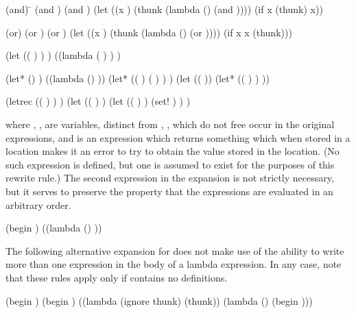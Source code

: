 \begin{schemenoindent}
(and)         \=\iet  \schtrue
(and )\>\iet  {}
(and   \dotsfoo)
\iet  (let ((x )
            (thunk (lambda () (and  \dotsfoo))))
        (if x (thunk) x))

(or)          \>\iet  \schfalse
(or )\>\iet  {}
(or   \dotsfoo)
\iet  (let ((x )
            (thunk (lambda () (or  \dotsfoo))))
        (if x x (thunk)))

(let (( ) \dotsfoo)
  )
\iet  ((lambda ( \dotsfoo) )  \dotsfoo)

(let* () )
\iet  ((lambda () ))
(let* (( )
       ( )
       \dotsfoo)
  )
\iet  (let (( )) 
        (let* (( )
               \dotsfoo)
          ))

(letrec (( )
         \dotsfoo)
  )
\iet  (let (( )
            \dotsfoo)
         (let (( )
               \dotsfoo)
           (set!  )
           \dotsfoo)
         )%
\end{schemenoindent}
where , , \dotsfoo{} are variables, distinct
from , \dotsfoo{}, which do not free occur in the
original  expressions, and  is an expression
which returns something which when stored in a location makes it an
error to try to obtain the value stored in the location.  (No such
expression is defined, but one is assumed to exist for the purposes of this
rewrite rule.)  The second  expression in the expansion is not
strictly necessary, but it serves to preserve the property that the
 expressions are evaluated in an arbitrary order.


\begin{schemenoindent}

(begin )
\iet  ((lambda () ))%
\end{schemenoindent}
The following alternative expansion for  does not make use of
the ability to write more than one expression in the body of a lambda
expression.  In any case, note that these rules apply only if
 contains no definitions.
\begin{schemenoindent}
(begin )\iet  {}
(begin  )
\iet  ((lambda (ignore thunk) (thunk))
       (lambda () (begin )))%
\end{schemenoindent}


